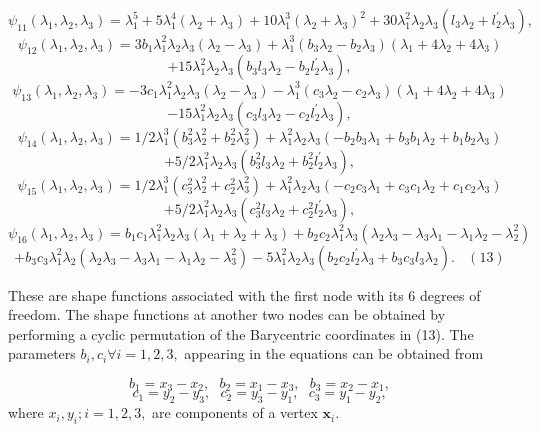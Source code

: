 \[ \psi_{11}(\lambda_1,\lambda_2,\lambda_3) = \lambda_1^5 + 5\lambda_1^4\left( \lambda_2+\lambda_3\right) + 10\lambda_1^3\left( \lambda_2+\lambda_3\right)^2 + 30\lambda_1^2\lambda_2\lambda_3\left( l_3\lambda_2 + l^{\prime}_2\lambda_3\right), \] \[ \psi_{12}(\lambda_1,\lambda_2,\lambda_3) = 3b_1\lambda_1^2\lambda_2\lambda_3\left( \lambda_2-\lambda_3\right) + \lambda_1^3\left(b_3\lambda_2 -b_2\lambda_3 \right)\left( \lambda_1+4\lambda_2+4\lambda_3\right) \] \[ + 15\lambda_1^2\lambda_2\lambda_3\left( b_3l_3\lambda_2-b_2l^{\prime}_2\lambda_3\right), \] \[ \psi_{13}(\lambda_1,\lambda_2,\lambda_3) = -3c_1\lambda_1^2\lambda_2\lambda_3\left( \lambda_2-\lambda_3\right) - \lambda_1^3\left(c_3\lambda_2 -c_2\lambda_3 \right)\left( \lambda_1+4\lambda_2+4\lambda_3\right) \] \[ - 15\lambda_1^2\lambda_2\lambda_3\left( c_3l_3\lambda_2-c_2l^{\prime}_2\lambda_3\right), \] \[ \psi_{14}(\lambda_1,\lambda_2,\lambda_3) = 1/2\lambda_1^3\left( b_3^2\lambda_2^2+b_2^2\lambda_3^2\right) + \lambda_1^2\lambda_2\lambda_3\left(-b_2b_3\lambda_1 + b_3b_1\lambda_2 + b_1b_2\lambda_3 \right) \] \[ + 5/2\lambda_1^2\lambda_2\lambda_3\left( b_3^2l_3\lambda_2+b_2^2l^{\prime}_2\lambda_3\right), \] \[ \psi_{15}(\lambda_1,\lambda_2,\lambda_3) = 1/2\lambda_1^3\left( c_3^2\lambda_2^2+c_2^2\lambda_3^2\right) + \lambda_1^2\lambda_2\lambda_3\left(-c_2c_3\lambda_1 + c_3c_1\lambda_2 + c_1c_2\lambda_3 \right) \] \[ + 5/2\lambda_1^2\lambda_2\lambda_3\left( c_3^2l_3\lambda_2+c_2^2l^{\prime}_2\lambda_3\right), \] \[ \psi_{16}(\lambda_1,\lambda_2,\lambda_3) = b_1c_1\lambda_1^2\lambda_2\lambda_3\left( \lambda_1+\lambda_2+\lambda_3\right) + b_2c_2\lambda_1^2\lambda_3\left( \lambda_2\lambda_3 - \lambda_3\lambda_1 - \lambda_1\lambda_2 - \lambda_2^2\right) \] \[ + b_3c_3\lambda_1^2\lambda_2\left( \lambda_2\lambda_3 - \lambda_3\lambda_1 - \lambda_1\lambda_2 - \lambda_3^2\right) - 5\lambda_1^2\lambda_2\lambda_3\left( b_2c_2l^{\prime}_2\lambda_3 + b_3c_3l_3\lambda_2\right). \ \ \ \ (13)\]

These are shape functions associated with the first node with its 6 degrees of freedom. The shape functions at another two nodes can be obtained by performing a cyclic permutation of the Barycentric coordinates in (13). The parameters $ b_i, c_i \forall i = 1,2,3, $ appearing in the equations can be obtained from

\[ b_1 = x_3 - x_2, \ \ \ b_2 = x_1-x_3, \ \ \ b_3 = x_2 - x_1, \] \[ c_1 = y_2 - y_3, \ \ \ c_2 = y_3-y_1, \ \ \ c_3 = y_1 - y_2, \] where $x_i,y_i; i=1,2,3,$ are components of a vertex $\mathbf{x}_i. $

